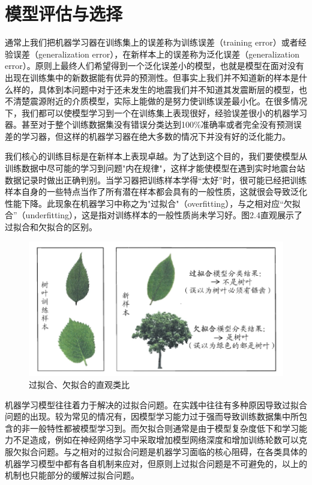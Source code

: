 		
\section{模型评估与选择}

 \indent 通常上我们把机器学习器在训练集上的误差称为训练误差（training error）或者经验误差（generalization error），在新样本上的误差称为泛化误差（generalization error）。原则上最终人们希望得到一个泛化误差小的模型，也就是模型在面对没有出现在训练集中的新数据能有优异的预测性。但事实上我们并不知道新的样本是什么样的，具体到本问题中对于还未发生的地震我们并不知道其发震断层的模型，也不清楚震源附近的介质模型，实际上能做的是努力使训练误差最小化。在很多情况下，我们都可以使模型学习到一个在训练集上表现很好，经验误差很小的机器学习器。甚至对于整个训练数据集没有错误分类达到100\%准确率或者完全没有预测误差的学习器，但这样的机器学习器在绝大多数的情况下并没有好的泛化能力。
 
 \indent 我们核心的训练目标是在新样本上表现卓越。为了达到这个目的，我们要使模型从训练数据中尽可能的学习到问题"内在规律"，这样才能使模型在遇到实时地震台站数据记录时做出正确判别。当学习器把训练样本学得“太好”时，很可能已经把训练样本自身的一些特点当作了所有潜在样本都会具有的一般性质，这就很会导致泛化性能下降。此现象在机器学习中称之为"过拟合"（overfitting），与之相对应“欠拟合”（underfitting），这是指对训练样本的一般性质尚未学习好。图2.4直观展示了过拟合和欠拟合的区别。
 
\begin{figure}[ht]
  \centering
  \includegraphics[width=\linewidth]{img/fitting.jpg}
  \caption{过拟合、欠拟合的直观类比}\label{fig:yinglimoxin}
\end{figure}

 \indent 机器学习模型往往着力于解决的过拟合问题。在实践中往往有多种原因导致过拟合问题的出现。较为常见的情况有，因模型学习能力过于强而导致训练数据集中所包含的非一般特性都被模型学习到。而欠拟合则通常是由于模型复杂度低下和学习能力不足造成，例如在神经网络学习中采取增加模型网络深度和增加训练轮数可以克服欠拟合问题。与之相对的过拟合问题是机器学习面临的核心阻碍，在各类具体的机器学习模型中都有各自机制来应对，但原则上过拟合问题是不可避免的，以上的机制也只能部分的缓解过拟合问题。
 
